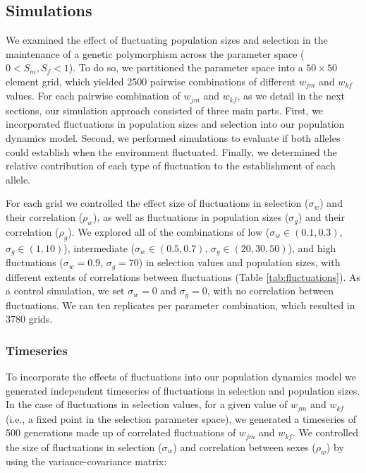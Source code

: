 \documentclass[12pt]{article}
\begin{document}
\subsection*{Simulations}
We examined the effect of fluctuating population sizes and selection in the maintenance of a genetic polymorphism across the parameter space ($0 < S_{m}, S_{f} < 1$). To do so, we partitioned the parameter space into a $50 \times 50$ element grid, which yielded 2500 pairwise combinations of different $w_{jm}$ and $w_{kf}$ values. For each pairwise combination of $w_{jm}$ and $w_{kf}$, as we detail in the next sections, our simulation approach consisted of three main parts. First, we incorporated fluctuations in population sizes and selection into our population dynamics model. Second, we performed simulations to evaluate if both alleles could establish when the environment fluctuated. Finally, we determined the relative contribution of each type of fluctuation to the establishment of each allele.

For each grid we controlled the effect size of  fluctuations in selection ($\sigma_{w}$) and their correlation ($\rho_{w}$), as well as fluctuations in population sizes ($\sigma_{g}$) and their correlation ($\rho_{g}$). We explored all of  the combinations of low ($\sigma_{w}\in{(0.1, 0.3)}$, $\sigma_{g}\in{(1,10)}$), intermediate ($\sigma_{w}\in{(0.5, 0.7)}$, $\sigma_{g}\in{(20,30,50)}$), and high fluctuations ($\sigma_{w}= 0.9$, $\sigma_{g}=70$)  in selection values and population sizes, with different extents of correlations between fluctuations (Table \ref{tab:fluctuations}).  As a control simulation, we set $\sigma_{w}= 0$ and  $\sigma_{g}=0$, with no correlation between fluctuations. We ran ten replicates per parameter combination, which resulted in 3780 grids.
\subsubsection*{Timeseries}

To incorporate the effects of fluctuations into our population dynamics model we generated independent timeseries of fluctuations in selection and population sizes. In the case of fluctuations in selection values, for a given value of $w_{jm}$ and $w_{kf}$ (i.e., a fixed point in the selection parameter space), we generated a timeseries of 500 generations made up of correlated fluctuations of $w_{jm}$ and $w_{kf}$. We controlled the size of  fluctuations in selection ($\sigma_{w}$) and correlation between sexes ($\rho_{w}$) by  using the variance-covariance matrix:
\end{document}
